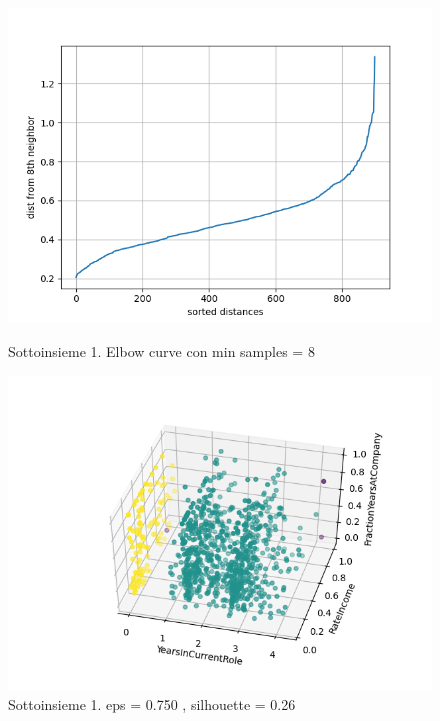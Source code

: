 \documentclass[a4paper,9pt]{article}
\begin{document}
\begin{figure}[H]
\begin{minipage}[b]{0.45\textwidth}
\centering
\includegraphics[width=\textwidth]{Figure_1.png}
\caption{Sottoinsieme 1. Elbow curve con min samples =  8 }
\label{etichetta1}
\end{minipage}
\hfill
\begin{minipage}[b]{0.45\textwidth}
\centering
\includegraphics[width=\textwidth]{Figure_24.png}
\caption{Sottoinsieme 1. eps = 0.750 , silhouette = 0.26 }
\label{etichetta2}
\end{minipage}
\end{figure}
\end{document}

